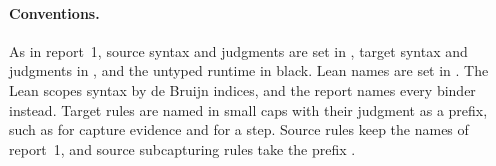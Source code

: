 \paragraph{Conventions.}
As in report~1, source syntax and judgments are set in , target syntax and judgments in , and the untyped runtime in black. Lean names are set in . The Lean scopes syntax by de Bruijn indices, and the report names every binder instead. Target rules are named in small caps with their judgment as a prefix, such as  for capture evidence and  for a step. Source rules keep the names of report~1, and source subcapturing rules take the prefix .
